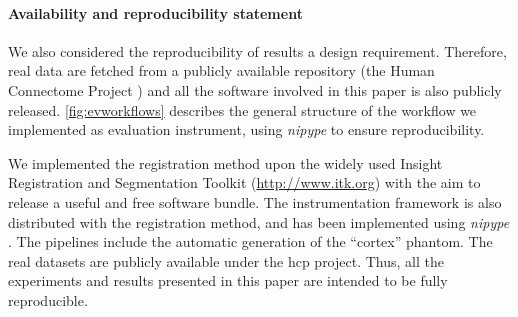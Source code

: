 

\paragraph*{Availability and reproducibility statement}
{\color{red} We also considered the reproducibility of results a design requirement.
Therefore, real data are fetched from a publicly available repository
  (the Human Connectome Project \citep{essen_human_2012}) and all the software
  involved in this paper is also publicly released.
\autoref{fig:evworkflows} describes the general structure of the workflow we implemented
  as evaluation instrument, using \emph{nipype} \citep{gorgolewski_nipype_2011} to ensure
  reproducibility.

We implemented the registration method upon the widely used Insight Registration and Segmentation
	Toolkit (\url{http://www.itk.org}) with the aim to release a useful and free software bundle.
The instrumentation framework is also distributed with the registration method,
  and has been implemented using \emph{nipype} \citep{gorgolewski_nipype_2011}.
The pipelines include the automatic generation of the ``cortex'' phantom.
The real datasets are publicly available under the \gls*{hcp} project.
Thus, all the experiments and results presented in this paper are intended to be
  fully reproducible.}